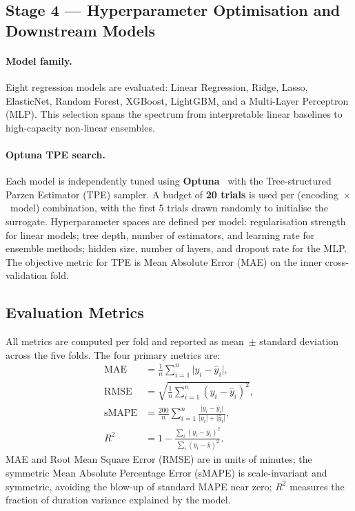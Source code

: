 \documentclass[3p]{elsarticle}
\begin{document}
\subsection{Stage 4 — Hyperparameter Optimisation and Downstream Models}
\label{sec:hpo}

\paragraph{Model family.}
Eight regression models are evaluated: Linear Regression, Ridge, Lasso, ElasticNet, Random Forest, XGBoost, LightGBM, and a Multi-Layer Perceptron (MLP). This selection spans the spectrum from interpretable linear baselines to high-capacity non-linear ensembles.

\paragraph{Optuna TPE search.}
Each model is independently tuned using \textbf{Optuna}~\cite{akiba2019optuna} with the Tree-structured Parzen Estimator (TPE) sampler. A budget of \textbf{20 trials} is used per (encoding~$\times$~model) combination, with the first 5 trials drawn randomly to initialise the surrogate. Hyperparameter spaces are defined per model: regularisation strength for linear models; tree depth, number of estimators, and learning rate for ensemble methods; hidden size, number of layers, and dropout rate for the MLP. The objective metric for TPE is Mean Absolute Error (MAE) on the inner cross-validation fold.

\subsection{Evaluation Metrics}
\label{sec:eval}

All metrics are computed per fold and reported as mean~$\pm$ standard deviation across the five folds. The four primary metrics are:
\begin{align}
  \mathrm{MAE}   &= \frac{1}{n}\sum_{i=1}^{n}\lvert y_i - \hat{y}_i\rvert,
                 \label{eq:mae}\\[4pt]
  \mathrm{RMSE}  &= \sqrt{\frac{1}{n}\sum_{i=1}^{n}(y_i - \hat{y}_i)^2},
                 \label{eq:rmse}\\[4pt]
  \mathrm{sMAPE} &= \frac{200}{n}\sum_{i=1}^{n}
                    \frac{\lvert y_i - \hat{y}_i\rvert}{\lvert y_i\rvert+\lvert\hat{y}_i\rvert},
                 \label{eq:smape}\\[4pt]
  R^{2}          &= 1 - \frac{\sum_{i}(y_i-\hat{y}_i)^2}{\sum_{i}(y_i-\bar{y})^2}.
                 \label{eq:r2}
\end{align}
MAE and Root Mean Square Error (RMSE) are in units of minutes; the symmetric Mean Absolute Percentage Error (sMAPE) is scale-invariant and symmetric, avoiding the blow-up of standard MAPE near zero; $R^{2}$ measures the fraction of duration variance explained by the model.
\end{document}
